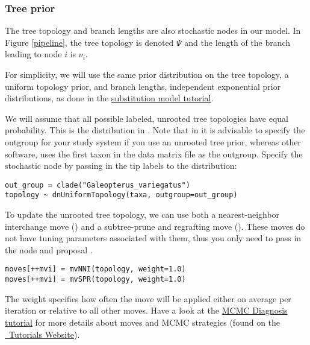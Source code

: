 \subsubsection{Tree prior}

The tree topology and branch lengths are also stochastic nodes in our model. 
In Figure \ref{pipeline}, the tree topology is denoted $\Psi$ and the length of the branch leading to node $i$ is $\nu_i$.

For simplicity, we will use the same prior distribution on the tree topology, a uniform topology prior, and branch lengths, independent exponential prior distributions, as done in the \href{https://github.com/revbayes/revbayes_tutorial/raw/master/tutorial_TeX/RB_CTMC_Tutorial/RB_CTMC_Tutorial.pdf}{substitution model tutorial}.

We will assume that all possible labeled, unrooted tree topologies have equal probability. 
This is the  distribution in \RevBayes. 
Note that in \RevBayes it is advisable to specify the outgroup for your study system if you use an unrooted tree prior, whereas other software, \EG \MrBayes uses the first taxon in the data matrix file as the outgroup.
Specify the  stochastic node by passing in the tip labels  to the  distribution:
{\tt \begin{snugshade*}
\begin{lstlisting}
out_group = clade("Galeopterus_variegatus")
topology ~ dnUniformTopology(taxa, outgroup=out_group)
\end{lstlisting}
\end{snugshade*}}

To update the unrooted tree topology, we can use both a nearest-neighbor interchange move () and a subtree-prune and regrafting move (). 
These moves do not have tuning parameters associated with them, thus you only need to pass in the  node and proposal . 
{\tt \begin{snugshade*}
\begin{lstlisting}
moves[++mvi] = mvNNI(topology, weight=1.0)
moves[++mvi] = mvSPR(topology, weight=1.0)
\end{lstlisting}
\end{snugshade*}}
The weight specifies how often the move will be applied either on average per iteration or relative to all other moves.
Have a look at the \href{https://github.com/revbayes/revbayes_tutorial/raw/master/tutorial_TeX/RB_MCMC_Tutorial/RB_MCMC_Tutorial.pdf}{MCMC Diagnosis tutorial} for more details about moves and MCMC strategies (found on the \href{http://revbayes.github.io/tutorials.html}{\RevBayes~Tutorials Website}).


